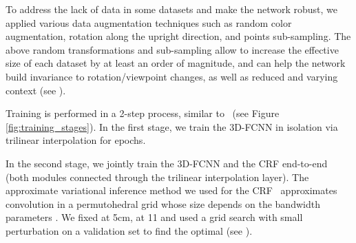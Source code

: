 \documentclass[10pt,twocolumn,letterpaper]{article}
\newcommand{\fccrf}[0]{CRF\xspace}
\newcommand{\threedfcnn}[0]{3D-FCNN\xspace}
\begin{document}
To address the lack of data in some datasets and make the network robust, we applied various data augmentation techniques such as random color augmentation, rotation along the upright direction, and points sub-sampling. The above random transformations and sub-sampling allow to increase the effective size of each dataset by at least an order of magnitude, and can help the network build invariance to rotation/viewpoint changes, as well as reduced and varying context (see \cite{segcloudsuppl}).

Training is performed in a 2-step process, similar to~\cite{Zheng2015} (see Figure \ref{fig:training_stages}). In the first stage, we train the \threedfcnn in isolation via trilinear interpolation  for  epochs.

In the second stage, we jointly train the \threedfcnn and the \fccrf end-to-end (both modules connected through the trilinear interpolation layer).
The approximate variational inference method we used for the \fccrf~\cite{denseCRF} approximates convolution in a permutohedral grid whose size depends on the bandwidth parameters .  We fixed  at 5cm,  at 11 and used a grid search with small perturbation on a validation set to find the optimal  (see \cite{segcloudsuppl}). 
\end{document}
